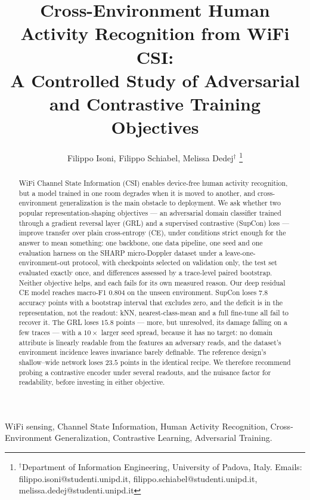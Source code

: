 \documentclass[10pt, conference, letterpaper]{IEEEtran}
\title{Cross-Environment Human Activity Recognition from WiFi CSI:\\ A Controlled Study of Adversarial and Contrastive Training Objectives}
\author{Filippo Isoni, Filippo Schiabel, Melissa Dedej$^\dag$
\thanks{$^\dag$Department of Information Engineering, University of Padova,
Italy. Emails: filippo.isoni@studenti.unipd.it,
filippo.schiabel@studenti.unipd.it, melissa.dedej@studenti.unipd.it}
}
\begin{document}

\maketitle

\begin{abstract}
WiFi Channel State Information (CSI) enables device-free human activity
recognition, but a model trained in one room degrades when it is moved to
another, and cross-environment generalization is the main obstacle to
deployment. We ask whether two popular representation-shaping objectives ---
an adversarial domain classifier trained through a gradient reversal layer
(GRL) and a supervised contrastive (SupCon) loss --- improve transfer over
plain cross-entropy (CE), under conditions strict enough for the answer to
mean something: one backbone, one data pipeline, one seed and one
evaluation harness on the SHARP micro-Doppler dataset under a
leave-one-environment-out protocol, with checkpoints selected on validation
only, the test set evaluated exactly once, and differences assessed by a
trace-level paired bootstrap. Neither objective helps, and each fails for its
own measured reason. Our deep residual CE model reaches macro-F1 $0.804$ on
the unseen environment. SupCon loses $7.8$ accuracy points with a bootstrap
interval that excludes zero, and the deficit is in the representation, not the
readout: kNN, nearest-class-mean and a full fine-tune all fail to recover it.
The GRL loses $15.8$ points --- more, but unresolved, its damage falling on a
few traces --- with a $10\times$ larger seed spread, because it has no target:
no domain attribute is linearly readable from the features an adversary reads,
and the dataset's environment incidence leaves invariance barely definable. The reference design's shallow--wide network loses $23.5$ points in
the identical recipe. We therefore recommend probing a contrastive encoder
under several readouts, and the nuisance factor for readability, before
investing in either objective.
\end{abstract}

\IEEEkeywords
WiFi sensing, Channel State Information, Human Activity Recognition,
Cross-Environment Generalization, Contrastive Learning, Adversarial Training.
\endIEEEkeywords














\end{document}
